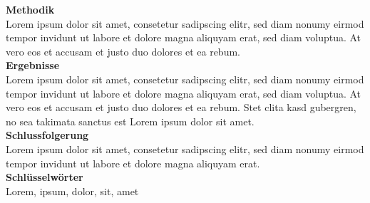 {{{            \textbf{Methodik}\\
            Lorem ipsum dolor sit amet, consetetur sadipscing elitr, sed diam nonumy eirmod tempor invidunt ut labore et dolore magna aliquyam erat, sed diam voluptua. At vero eos et accusam et justo duo dolores et ea rebum.\\

            \textbf{Ergebnisse}\\
            Lorem ipsum dolor sit amet, consetetur sadipscing elitr, sed diam nonumy eirmod tempor invidunt ut labore et dolore magna aliquyam erat, sed diam voluptua. At vero eos et accusam et justo duo dolores et ea rebum. Stet clita kasd gubergren, no sea takimata sanctus est Lorem ipsum dolor sit amet.\\

            \textbf{Schlussfolgerung}\\
            Lorem ipsum dolor sit amet, consetetur sadipscing elitr, sed diam nonumy eirmod tempor invidunt ut labore et dolore magna aliquyam erat.\\

            \textbf{Schlüsselwörter}\\
            Lorem, ipsum, dolor, sit, amet
        }
    }

}

